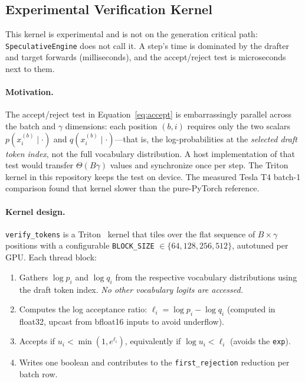 \documentclass[11pt]{article}
\begin{document}
\subsection{Experimental Verification Kernel}
\label{sec:kernel}

This kernel is experimental and is not on the generation critical path:
\texttt{SpeculativeEngine} does not call it.
A step's time is dominated by the drafter and target forwards
(milliseconds), and the accept/reject test is microseconds next to them.

\paragraph{Motivation.}
The accept/reject test in Equation~\ref{eq:accept} is
embarrassingly parallel across the batch and $\gamma$ dimensions: each
position $(b, i)$ requires only the two scalars
$p(x_i^{(b)}\mid \cdot)$ and $q(x_i^{(b)}\mid \cdot)$---that is, the
log-probabilities at the \emph{selected draft token index}, not the full
vocabulary distribution.
A host implementation of that test would transfer $\Theta(B\gamma)$ values
and synchronize once per step.
The Triton kernel in this repository keeps the test on device.
The measured Tesla T4 batch-1 comparison found that kernel slower than
the pure-PyTorch reference.

\paragraph{Kernel design.}
\texttt{verify\_tokens} is a Triton~\citep{triton2019} kernel that tiles over
the flat sequence of $B \times \gamma$ positions with a configurable
\texttt{BLOCK\_SIZE} $\in \{64, 128, 256, 512\}$, autotuned per GPU.
Each thread block:
\begin{enumerate}
  \item Gathers $\log p_i$ and $\log q_i$ from the respective vocabulary
        distributions using the draft token index.
        \emph{No other vocabulary logits are accessed.}
  \item Computes the log acceptance ratio:
        $\ell_i = \log p_i - \log q_i$ (computed in float32, upcast from
        bfloat16 inputs to avoid underflow).
  \item Accepts if $u_i < \min(1, e^{\ell_i})$, equivalently if
        $\log u_i < \ell_i$ (avoids the \texttt{exp}).
  \item Writes one boolean and contributes to the \texttt{first\_rejection}
        reduction per batch row.
\end{enumerate}
\end{document}
